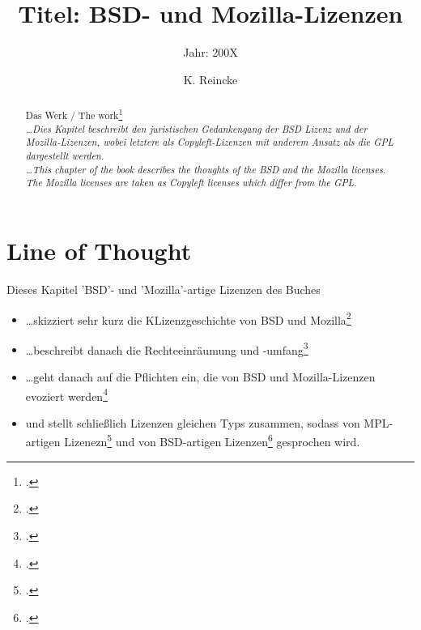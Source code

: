 \documentclass[DIV=calc,BCOR=5mm,11pt,headings=small,oneside,abstract=true, toc=bib]{scrartcl}
\begin{document}

\titlehead{Literaturexzerpt}
\subject{Autor(en): Arl etc.}
\title{Titel: BSD- und Mozilla-Lizenzen}
\subtitle{Jahr: 200X }
\author{K. Reincke}

\maketitle

\begin{abstract}
Das Werk / The work\footcite[][]{ArlBriVol2004a} \\
\noindent \itshape
\ldots Dies Kapitel beschreibt den juristischen Gedankengang der BSD Lizenz und
der Mozilla-Lizenzen, wobei letztere als Copyleft-Lizenzen mit anderem Ansatz
als die GPL dargestellt werden. \\
\noindent
\ldots This chapter of the book describes the thoughts of the BSD and the
Mozilla licenses. The Mozilla licenses are taken as Copyleft licenses which
differ from the GPL.
\end{abstract}
\footnotesize
\normalsize

\section{Line of Thought}

Dieses Kapitel \glqq{}'BSD'- und 'Mozilla'-artige Lizenzen\grqq{} des Buches

\begin{itemize}
  \item \ldots skizziert sehr kurz die KLizenzgeschichte von BSD und
  Mozilla\footcite[vgl.][318ff]{ArlBriVol2004a}
  \item \ldots beschreibt danach die \glqq{}Rechteeinräumung und
  -umfang\grqq{}\footcite[vgl.][323ff]{ArlBriVol2004a}
  \item \ldots geht danach auf die Pflichten ein, die von BSD und
  Mozilla-Lizenzen evoziert werden\footcite[vgl.][342ff]{ArlBriVol2004a}
  \item und stellt schließlich Lizenzen gleichen Typs zusammen, sodass von
  \glqq{}MPL-artigen Lizenezn\grqq{}\footcite[vgl.][361ff]{ArlBriVol2004a} und
  von \glqq{}BSD-artigen Lizenzen\grqq{}\footcite[vgl.][364ff]{ArlBriVol2004a}
  gesprochen wird.
\end{itemize}
\end{document}
